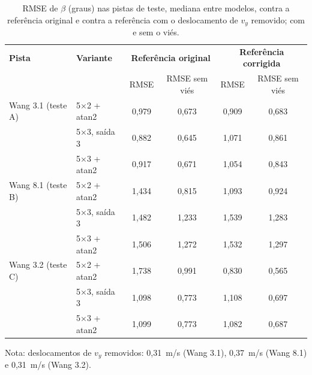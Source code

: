 \begin{table}[htbp]
    \centering
    \caption{RMSE de $\beta$ (graus) nas pistas de teste, mediana entre modelos, contra a referência original e contra a referência com o deslocamento de $v_y$ removido; com e sem o viés.}
    \label{tab:reavaliacao}
    \small
    \begin{tabular}{llcccc}
        \toprule
        \textbf{Pista} & \textbf{Variante} & \multicolumn{2}{c}{\textbf{Referência original}} & \multicolumn{2}{c}{\textbf{Referência corrigida}} \\ & & RMSE & RMSE sem viés & RMSE & RMSE sem viés \\
        \midrule
        Wang 3.1 (teste A) & 5×2 + atan2 & 0,979 & 0,673 & 0,909 & 0,683 \\
         & 5×3, saída 3 & 0,882 & 0,645 & 1,071 & 0,861 \\
         & 5×3 + atan2 & 0,917 & 0,671 & 1,054 & 0,843 \\
        Wang 8.1 (teste B) & 5×2 + atan2 & 1,434 & 0,815 & 1,093 & 0,924 \\
         & 5×3, saída 3 & 1,482 & 1,233 & 1,539 & 1,283 \\
         & 5×3 + atan2 & 1,506 & 1,272 & 1,532 & 1,297 \\
        Wang 3.2 (teste C) & 5×2 + atan2 & 1,738 & 0,991 & 0,830 & 0,565 \\
         & 5×3, saída 3 & 1,098 & 0,773 & 1,108 & 0,697 \\
         & 5×3 + atan2 & 1,099 & 0,773 & 1,082 & 0,687 \\
        \bottomrule
    \end{tabular}
    \par\footnotesize Nota: deslocamentos de $v_y$ removidos: 0,31~m/s (Wang 3.1), 0,37~m/s (Wang 8.1) e 0,31~m/s (Wang 3.2).
\end{table}
